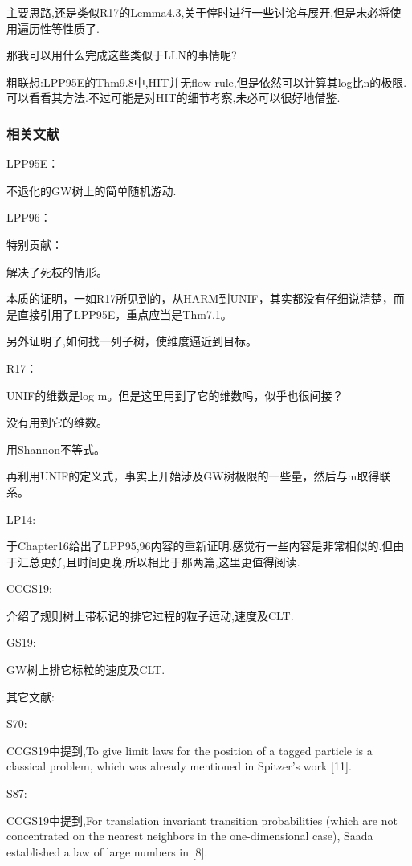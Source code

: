 \documentclass[a4paper,oneside]{ctexbook}
\begin{document}
				主要思路,还是类似R17的Lemma4.3,关于停时进行一些讨论与展开,但是未必将使用遍历性等性质了.

				那我可以用什么完成这些类似于LLN的事情呢?

				粗联想:LPP95E的Thm9.8中,HIT并无flow rule,但是依然可以计算其log比n的极限.可以看看其方法.不过可能是对HIT的细节考察,未必可以很好地借鉴.

	
			\subsubsection*{相关文献}

				\qquad LPP95E\cite{LPP95E}：

					不退化的GW树上的简单随机游动.

				\qquad LPP96\cite{LPP96B}：

					特别贡献：

					解决了死枝的情形。

					本质的证明，一如R17所见到的，从HARM到UNIF，其实都没有仔细说清楚，而是直接引用了LPP95E，重点应当是Thm7.1。

					另外证明了,如何找一列子树，使维度逼近到目标。

				\qquad R17\cite{R17}：
					
					UNIF的维数是log m。但是这里用到了它的维数吗，似乎也很间接？

					没有用到它的维数。

					用Shannon不等式。

					再利用UNIF的定义式，事实上开始涉及GW树极限的一些量，然后与m取得联系。

				\qquad LP14\cite{LP14}:

					于Chapter16给出了LPP95,96内容的重新证明.感觉有一些内容是非常相似的.但由于汇总更好,且时间更晚,所以相比于那两篇,这里更值得阅读.

				\qquad CCGS19\cite{CCGS19}:

					介绍了规则树上带标记的排它过程的粒子运动,速度及CLT.

				\qquad GS19\cite{GS19}:

					GW树上排它标粒的速度及CLT.

				其它文献:

				S70:

					CCGS19中提到,To give limit laws for the position of a tagged particle is a classical problem, which was already mentioned in Spitzer’s work [11].

				S87:

					CCGS19中提到,For translation invariant transition probabilities (which are not concentrated on the nearest neighbors in the one-dimensional case), Saada established a law of large numbers in [8].
\end{document}
